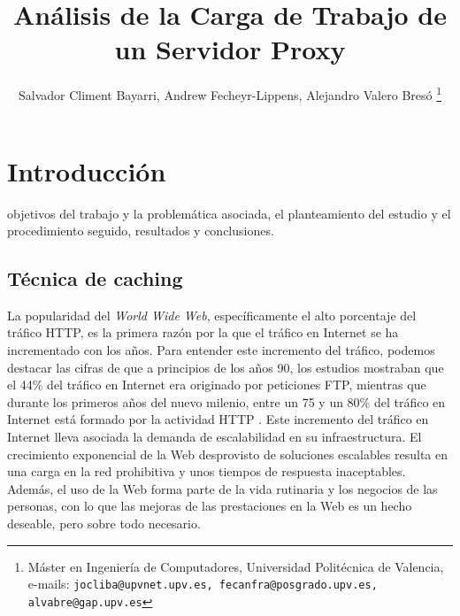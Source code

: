 \documentclass[twocolumn]{Jornadas}
\begin{document}
\title{Análisis de la Carga de Trabajo de un Servidor Proxy}

\author{%
     Salvador Climent Bayarri, %
     Andrew Fecheyr-Lippens, %
     Alejandro Valero Bresó%
	\thanks{Máster en Ingeniería de Computadores, Universidad Politécnica de Valencia, e-mails: {\tt jocliba@upvnet.upv.es, fecanfra@posgrado.upv.es, alvabre@gap.upv.es}}
     }

\maketitle
\markboth{}{}
\pagestyle{empty}
\thispagestyle{empty} %

\begin{abstract}

\end{abstract}

\begin{keywords}

\end{keywords}

\section{Introducción}
\label{intro}

 objetivos del trabajo y la problemática asociada, el planteamiento
del estudio y el procedimiento seguido, resultados y conclusiones.

\subsection{Técnica de caching}

La popularidad del \emph{World Wide Web}, específicamente el alto porcentaje del tráfico HTTP, es la primera razón por la que el tráfico en Internet se ha incrementado con los años. Para entender este incremento del tráfico, podemos destacar las cifras de que a principios de los años 90, los estudios mostraban que el 44\% del tráfico en Internet era originado por peticiones FTP, mientras que durante los primeros años del nuevo milenio, entre un 75 y un 80\% del tráfico en Internet está formado por la actividad HTTP \cite{barish}. Este incremento del tráfico en Internet lleva asociada la demanda de escalabilidad en su infraestructura. El crecimiento exponencial de la Web desprovisto de soluciones escalables resulta en una carga en la red prohibitiva y unos tiempos de respuesta inaceptables. Además, el uso de la Web forma parte de la vida rutinaria y los negocios de las personas, con lo que las mejoras de las prestaciones en la Web es un hecho deseable, pero sobre todo necesario.
\end{document}
